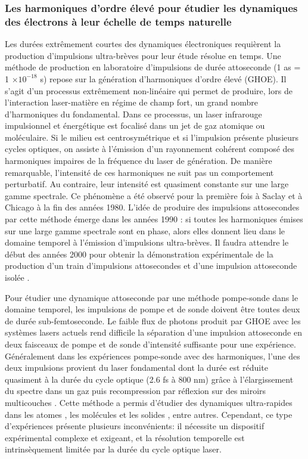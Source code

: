 \subsubsection*{Les harmoniques d'ordre élevé pour étudier les dynamiques des électrons à leur échelle de temps naturelle}
Les durées extrêmement courtes des dynamiques électroniques requièrent la production d'impulsions ultra-brèves pour leur étude résolue en temps. Une méthode de production en laboratoire d'impulsions de durée attoseconde (1 as = 1 $\times 10^{-18}$ s) repose sur la génération d'harmoniques d'ordre élevé (GHOE). Il s’agit d’un processus extrêmement non-linéaire qui permet de produire, lors de l'interaction laser-matière en régime de champ fort, un grand nombre d’harmoniques du fondamental. Dans ce processus, un laser infrarouge impulsionnel et énergétique est focalisé dans un jet de gaz atomique ou moléculaire. Si le milieu est centrosymétrique et si l'impulsion présente plusieurs cycles optiques, on assiste à l'émission d’un rayonnement cohérent composé des harmoniques impaires de la fréquence du laser de génération. De manière remarquable, l’intensité de ces harmoniques ne suit pas un comportement perturbatif. Au contraire, leur intensité est quasiment constante sur une large gamme spectrale. Ce phénomène a été observé pour la première fois à Saclay  et à Chicago  à la fin des années 1980. L'idée de produire des impulsions attosecondes par cette méthode émerge dans les années 1990 : si toutes les harmoniques émises sur une large gamme spectrale sont en phase, alors elles donnent lieu dans le domaine temporel à l'émission d'impulsions ultra-brèves. Il faudra attendre le début des années 2000 pour obtenir la démonstration expérimentale de la production d'un train d'impulsions attosecondes  et d'une impulsion attoseconde isolée .

Pour étudier une dynamique attoseconde par une méthode pompe-sonde dans le domaine temporel, les impulsions de pompe et de sonde doivent être toutes deux de durée sub-femtoseconde. Le faible flux de photons produit par GHOE avec les systèmes lasers actuels rend difficile la séparation d'une impulsion attoseconde en deux faisceaux de pompe et de sonde d'intensité suffisante pour une expérience. Généralement dans les expériences pompe-sonde avec des harmoniques, l'une des deux impulsions provient du laser fondamental dont la durée est réduite quasiment à la durée du cycle optique (2.6 fs à 800 nm) grâce à l'élargissement du spectre dans un gaz puis recompression par réflexion sur des miroirs multicouches . Cette méthode a permis d'étudier des dynamiques ultra-rapides dans les atomes , les molécules  et les solides , entre autres. Cependant, ce type d'expériences présente plusieurs inconvénients: il nécessite un dispositif expérimental complexe et exigeant, et la résolution temporelle est intrinsèquement limitée par la durée du cycle optique laser.

